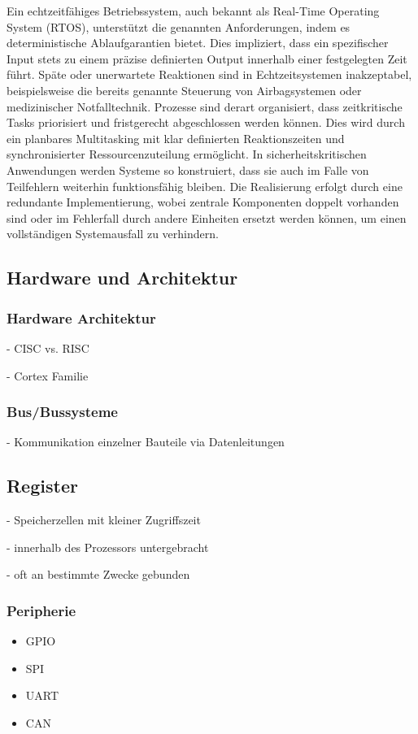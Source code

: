 Ein echtzeitfähiges Betriebssystem, auch bekannt als Real-Time Operating System (RTOS), unterstützt die genannten Anforderungen, indem es deterministische Ablaufgarantien bietet. 
Dies impliziert, dass ein spezifischer Input stets zu einem präzise definierten Output innerhalb einer festgelegten Zeit führt. 
Späte oder unerwartete Reaktionen sind in Echtzeitsystemen inakzeptabel, beispielsweise die bereits genannte Steuerung von Airbagsystemen oder medizinischer Notfalltechnik.
Prozesse sind derart organisiert, dass zeitkritische Tasks priorisiert und fristgerecht abgeschlossen werden können. 
Dies wird durch ein planbares Multitasking mit klar definierten Reaktionszeiten und synchronisierter Ressourcenzuteilung ermöglicht. 
In sicherheitskritischen Anwendungen werden Systeme so konstruiert, dass sie auch im Falle von Teilfehlern weiterhin funktionsfähig bleiben.
Die Realisierung erfolgt durch eine redundante Implementierung, wobei zentrale Komponenten doppelt vorhanden sind oder im Fehlerfall durch andere Einheiten ersetzt werden können, um einen vollständigen Systemausfall zu verhindern.

\subsection{Hardware und Architektur}
\subsubsection*{Hardware Architektur}
- CISC vs. RISC

- Cortex Familie

\subsubsection*{Bus/Bussysteme}
- Kommunikation einzelner Bauteile via Datenleitungen

\subsection*{Register}
- Speicherzellen mit kleiner Zugriffszeit

- innerhalb des Prozessors untergebracht

- oft an bestimmte Zwecke gebunden

\subsubsection*{Peripherie}
\begin{itemize}
	\item GPIO
	\item SPI
	\item UART
	\item CAN
\end{itemize}


